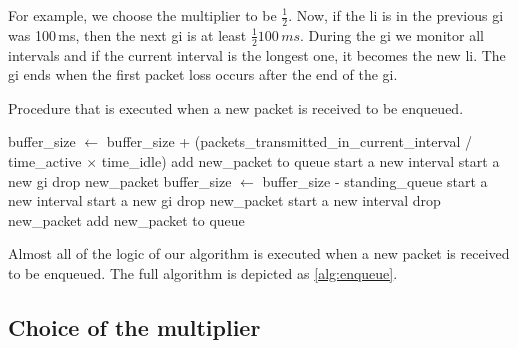 \documentclass[10pt,sigconf,letterpaper,dvipsnames\ifx\removeHeaders\tempYes ,nonacm\fi]{acmart}
\begin{document}
For example, we choose the multiplier to be $\frac{1}{2}$. Now, if the \gls{li} is in the previous \gls{gi} was 100\,ms, then the next \gls{gi} is at least $\frac{1}{2} 100\,ms$. During the \gls{gi} we monitor all intervals and if the current interval is the longest one, it becomes the new \gls{li}. The \gls{gi} ends when the first packet loss occurs after the end of the \gls{gi}. 

\begin{algorithm}[h]
\caption{Procedure that is executed when a new packet is received to be enqueued.}
\label{alg:enqueue}
\begin{algorithmic}[1]%
			\State buffer\_size $\gets$ buffer\_size + (packets\_transmitted\_in\_current\_interval / time\_active $\times$ time\_idle)
			\State add new\_packet to queue
			\State start a new interval
			\State start a new \gls{gi}
			\State drop new\_packet
				\State buffer\_size $\gets$ buffer\_size - standing\_queue
			\EndIf
			\State start a new interval
			\State start a new \gls{gi}
			\State drop new\_packet
		\Else
			\State start a new interval
			\State drop new\_packet
		\EndIf
	\Else
		\State add new\_packet to queue
	\EndIf
\EndFunction
\end{algorithmic}
\end{algorithm}
Almost all of the logic of our algorithm is executed when a new packet is received to be enqueued. The full algorithm is depicted as \autoref{alg:enqueue}.

\subsection{Choice of the multiplier}
\end{document}
